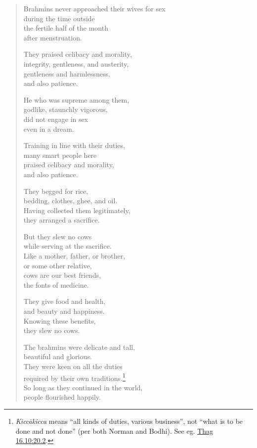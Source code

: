 \documentclass[12pt,openany]{book}%
\begin{document}
\begin{verse}
Brahmins never approached their wives for sex \\
during the time outside \\
the fertile half of the month \\
after menstruation. 

They praised celibacy and morality, \\
integrity, gentleness, and austerity, \\
gentleness and harmlessness, \\
and also patience. 

He who was supreme among them, \\
godlike, staunchly vigorous, \\
did not engage in sex \\
even in a dream. 

Training in line with their duties, \\
many smart people here \\
praised celibacy and morality, \\
and also patience. 

They begged for rice, \\
bedding, clothes, ghee, and oil. \\
Having collected them legitimately, \\
they arranged a sacrifice. 

But they slew no cows \\
while serving at the sacrifice. \\
Like a mother, father, or brother, \\
or some other relative, \\
cows are our best friends, \\
the fonts of medicine. 

They give food and health, \\
and beauty and happiness. \\
Knowing these benefits, \\
they slew no cows. 

The brahmins were delicate and tall, \\
beautiful and glorious. \\
They were keen on all the duties \\
required by their own traditions.\footnote{\textit{\textsanskrit{Kiccākicca}} means “all kinds of duties, various business”, not “what is to be done and not done” (per both Norman and Bodhi). See eg. \href{https://suttacentral.net/thag16.10/en/sujato\#20.2}{Thag 16.10:20.2}. } \\
So long as they continued in the world, \\
people flourished happily. 


\end{verse}
\end{document}
